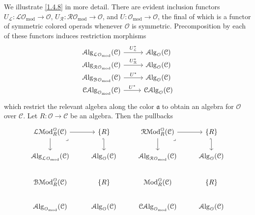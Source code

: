 \begin{discussion}\label{1.4.9}
	We illustrate \cref{1.4.8} in more detail. There are evident inclusion functors $U_\mathcal{L} : \mathcal{L} \mathcal{O} _{\mathrm{mod} }  \to \mathcal{O} $, $U_\mathcal{R} : \mathcal{R} \mathcal{O}_{\mathrm{mod} }  \to \mathcal{O}$, and $U : \mathcal{O} _{\mathrm{mod} }  \to \mathcal{O} $, the final of which is a functor of symmetric colored operads whenever $\mathcal{O} $ is symmetric. Precomposition by each of these functors induces restriction morphisms
	\[\begin{tikzcd}[row sep = 0em, column sep = 2.5em]
	\Alg_{\mathcal{L} \mathcal{O} _{\mathrm{mod} } } (\mathcal{C} )\ar[" U_\mathcal{L} ^* ", r]  & \Alg_\mathcal{O} (\mathcal{C} ) \\
	\Alg_{\mathcal{R} \mathcal{O} _{\mathrm{mod} } } (\mathcal{C} )\ar[" U_\mathcal{R} ^* ", r]  & \Alg_\mathcal{O} (\mathcal{C} ) \\
	\Alg_{\mathcal{B} \mathcal{O} _{\mathrm{mod} } } (\mathcal{C} )\ar[" U^* ", r]  & \Alg_\mathcal{O} (\mathcal{C} ) \\
	\mathcal{C}\Alg_{\mathcal{O} _{\mathrm{mod} } } (\mathcal{C} )\ar[" U^* ", r]  & \mathcal{C}\Alg_\mathcal{O} (\mathcal{C} ) 
	\end{tikzcd}\]
	which restrict the relevant algebra along the color $\mathfrak{a} $ to obtain an algebra for $\mathcal{O} $ over $\mathcal{C} $. Let $R : \mathcal{O}  \to \mathcal{C} $ be an algebra. Then the pullbacks
\[\begin{tikzcd}
	{\mathcal{L}\Mod^\mathcal{O}_R(\mathcal{C})} & {\{R\}} & {\mathcal{R}\Mod^\mathcal{O}_R(\mathcal{C})} & {\{R\}} \\
	{\Alg_{\mathcal{L}\mathcal{O}_{\mathrm{mod}}}(\mathcal{C})} & {\Alg_{\mathcal{O}}(\mathcal{C})} & {\Alg_{\mathcal{R}\mathcal{O}_{\mathrm{mod}}}(\mathcal{C})} & {\Alg_{\mathcal{O}}(\mathcal{C})} \\
	{\mathcal{B}\Mod^\mathcal{O}_R(\mathcal{C})} & {\{R\}} & {\Mod^\mathcal{O}_R(\mathcal{C})} & {\{R\}} \\
	{\Alg_{\mathcal{O}_{\mathrm{mod}}}(\mathcal{C})} & {\Alg_{\mathcal{O}}(\mathcal{C})} & {\mathcal{C}\Alg_{\mathcal{O}_{\mathrm{mod}}}(\mathcal{C})} & {\Alg_{\mathcal{O}}(\mathcal{C})}
	\arrow[from=1-1, to=1-2]
	\arrow[from=1-1, to=2-1]
	\arrow["\lrcorner"{anchor=center, pos=0.125}, draw=none, from=1-1, to=2-2]
	\arrow[hook', from=1-2, to=2-2]
	\arrow[from=1-3, to=1-4]
	\arrow[from=1-3, to=2-3]
	\arrow["\lrcorner"{anchor=center, pos=0.125}, draw=none, from=1-3, to=2-4]
	\arrow[hook', from=1-4, to=2-4]

\end{tikzcd}\]
\end{discussion}
